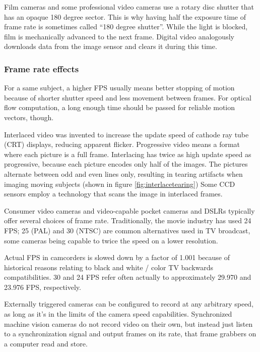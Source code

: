 Film cameras and some professional video cameras use a rotary disc shutter that has an opaque 180 degree sector.
This is why having half the exposure time of frame rate is sometimes called ``180 degree shutter''.
While the light is blocked, film is mechanically advanced to the next frame.
Digital video analogously downloads data from the image sensor and clears it during this time.


\subsubsection{Frame rate effects} %

For a same subject, a higher FPS usually means better stopping of motion because of shorter shutter speed and less movement between frames.
For optical flow computation, a long enough time should be passed for reliable motion vectors, though.

Interlaced video was invented to increase the update speed of cathode ray tube (CRT) displays, reducing apparent flicker.
Progressive video means a format where each picture is a full frame.
Interlacing has twice as high update speed as progressive, because each picture encodes only half of the images.
The pictures alternate between odd and even lines only, resulting in tearing artifacts when imaging moving subjects (shown in figure \ref{fig:interlacetearing})
Some CCD sensors employ a technology that scans the image in interlaced frames.


Consumer video cameras and video-capable pocket cameras and DSLRs typically offer several choices of frame rate. Traditionally, the movie industry has used 24 FPS; 25 (PAL) and 30 (NTSC) are common alternatives used in TV broadcast, some cameras being capable to twice the speed on a lower resolution.

Actual FPS in camcorders is slowed down by a factor of 1.001 because of historical reasons relating to black and white / color TV backwards compatibilities.
30 and 24 FPS refer often actually to approximately 29.970 and 23.976 FPS, respectively.

Externally triggered cameras can be configured to record at any arbitrary speed, as long as it's in the limits of the camera speed capabilities.
Synchronized machine vision cameras do not record video on their own, but instead just listen to a synchronization signal and output frames on its rate, that frame grabbers on a computer read and store.

